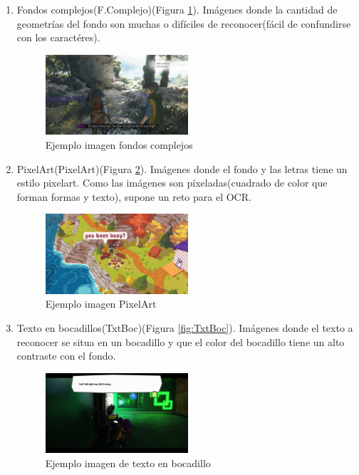 \begin{enumerate}
	\item Fondos complejos(F.Complejo)(Figura \ref{fig:Fcomplejo}). Imágenes donde la cantidad de geometrías del fondo son muchas o difíciles de reconocer(fácil de confundirse con los caractéres).
		\begin{figure}[H]
		\centering
		\includegraphics[width = 0.5\textwidth]{Imagenes/OCR/Complejo.png}
		\caption{Ejemplo imagen fondos complejos }
			\label{fig:Fcomplejo}
	\end{figure}
	\item PixelArt(PixelArt)(Figura \ref{fig:Pixelart}). Imágenes donde el fondo y las letras tiene un estilo pixelart. Como las imágenes son píxeladas(cuadrado de color que forman formas y texto), supone un reto para el OCR.
		\begin{figure}[H]
		\centering
		\includegraphics[width = 0.5\textwidth]{Imagenes/OCR/Pixel.png}
		\caption{Ejemplo imagen PixelArt }
		\label{fig:Pixelart}
	\end{figure}
	\item Texto en bocadillos(TxtBoc)(Figura \ref{fig:TxtBoc}). Imágenes donde el texto a reconocer se situa en un bocadillo y que el color del bocadillo tiene un alto contraste con el fondo.
		\begin{figure}[H]
		\centering
		\includegraphics[width = 0.5\textwidth]{Imagenes/OCR/Boc.png}
		\caption{Ejemplo imagen de texto en bocadillo }

\end{figure}
\end{enumerate}
